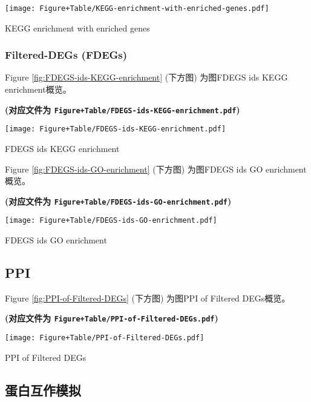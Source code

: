 \documentclass[
]{article}
\begin{document}
\def\@captype{figure}
\begin{center}
\texttt{[image: Figure+Table/KEGG-enrichment-with-enriched-genes.pdf]}
\caption{KEGG enrichment with enriched genes}\label{fig:KEGG-enrichment-with-enriched-genes}
\end{center}

\hypertarget{filtered-degs-fdegs}{%
\subsubsection{Filtered-DEGs (FDEGs)}\label{filtered-degs-fdegs}}

Figure \ref{fig:FDEGS-ids-KEGG-enrichment} (下方图) 为图FDEGS ids KEGG enrichment概览。

\textbf{(对应文件为 \texttt{Figure+Table/FDEGS-ids-KEGG-enrichment.pdf})}

\def\@captype{figure}
\begin{center}
\texttt{[image: Figure+Table/FDEGS-ids-KEGG-enrichment.pdf]}
\caption{FDEGS ids KEGG enrichment}\label{fig:FDEGS-ids-KEGG-enrichment}
\end{center}

Figure \ref{fig:FDEGS-ids-GO-enrichment} (下方图) 为图FDEGS ids GO enrichment概览。

\textbf{(对应文件为 \texttt{Figure+Table/FDEGS-ids-GO-enrichment.pdf})}

\def\@captype{figure}
\begin{center}
\texttt{[image: Figure+Table/FDEGS-ids-GO-enrichment.pdf]}
\caption{FDEGS ids GO enrichment}\label{fig:FDEGS-ids-GO-enrichment}
\end{center}

\hypertarget{ppi}{%
\subsection{PPI}\label{ppi}}

Figure \ref{fig:PPI-of-Filtered-DEGs} (下方图) 为图PPI of Filtered DEGs概览。

\textbf{(对应文件为 \texttt{Figure+Table/PPI-of-Filtered-DEGs.pdf})}

\def\@captype{figure}
\begin{center}
\texttt{[image: Figure+Table/PPI-of-Filtered-DEGs.pdf]}
\caption{PPI of Filtered DEGs}\label{fig:PPI-of-Filtered-DEGs}
\end{center}

\hypertarget{docking}{%
\subsection{蛋白互作模拟}\label{docking}}
\end{document}
